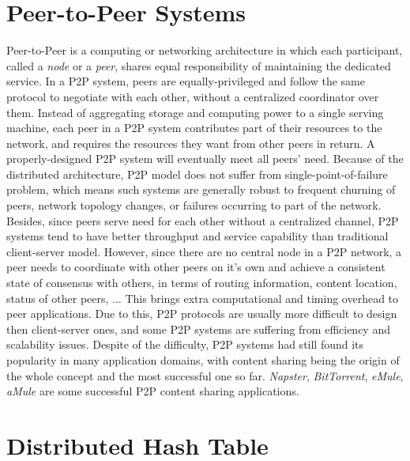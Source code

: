 \section{Peer-to-Peer Systems}
\label{s:peertopeersystems}

Peer-to-Peer is a computing or networking architecture in which each participant, called a \textit{node} or a \textit{peer}, shares equal responsibility of maintaining the dedicated service. In a P2P system, peers are equally-privileged and follow the same protocol to negotiate with each other, without a centralized coordinator over them. Instead of aggregating storage and computing power to a single serving machine, each peer in a P2P system contributes part of their resources to the network, and requires the resources they want from other peers in return. A properly-designed P2P system will eventually meet all peers' need. Because of the distributed architecture, P2P model does not suffer from single-point-of-failure problem, which means such systems are generally robust to frequent churning of peers, network topology changes, or failures occurring to part of the network. Besides, since peers serve need for each other without a centralized channel, P2P systems tend to have better throughput and service capability than traditional client-server model. However, since there are no central node in a P2P network, a peer needs to coordinate with other peers on it's own and achieve a consistent state of consensus with others, in terms of routing information, content location, status of other peers, ... This brings extra computational and timing overhead to peer applications. Due to this, P2P protocols are usually more difficult to design then client-server ones, and some P2P systems are suffering from efficiency and scalability issues. Despite of the difficulty, P2P systems had still found its popularity in many application domains, with content sharing being the origin of the whole concept and the most successful one so far. \textit{Napster}\cite{napster}, \textit{BitTorrent}\cite{bittorrent}, \textit{eMule}\cite{emule}, \textit{aMule}\cite{amule} are some successful P2P content sharing applications.

\section{Distributed Hash Table}
\label{s:distributedhashtable}

